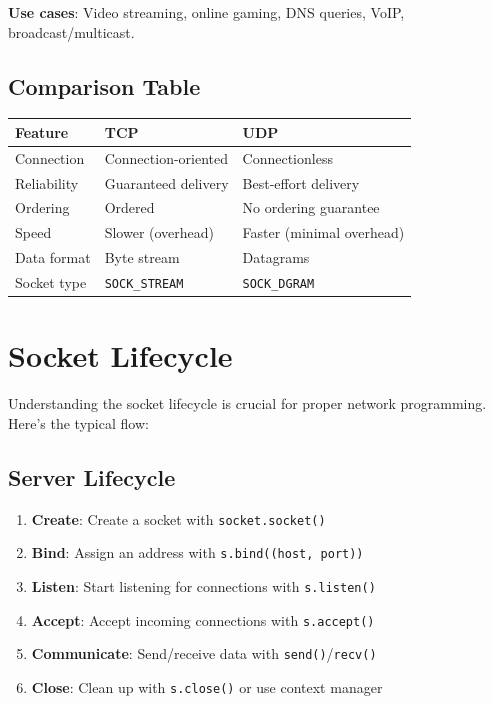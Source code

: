 \documentclass[]{article}
\begin{document}
  \textbf{Use cases}: Video streaming, online gaming, DNS queries, VoIP, broadcast/multicast.

  \subsection{Comparison Table}

  \begin{center}
  \begin{tabular}{lll}
    \toprule
    \textbf{Feature} & \textbf{TCP} & \textbf{UDP} \\
    \midrule
    Connection & Connection-oriented & Connectionless \\
    Reliability & Guaranteed delivery & Best-effort delivery \\
    Ordering & Ordered & No ordering guarantee \\
    Speed & Slower (overhead) & Faster (minimal overhead) \\
    Data format & Byte stream & Datagrams \\
    Socket type & \texttt{SOCK\_STREAM} & \texttt{SOCK\_DGRAM} \\
    \bottomrule
  \end{tabular}
  \end{center}

  \section{Socket Lifecycle}
  Understanding the socket lifecycle is crucial for proper network programming. Here's the typical flow:

  \subsection{Server Lifecycle}
  \begin{enumerate}
    \item \textbf{Create}: Create a socket with \texttt{socket.socket()}
    \item \textbf{Bind}: Assign an address with \texttt{s.bind((host, port))}
    \item \textbf{Listen}: Start listening for connections with \texttt{s.listen()}
    \item \textbf{Accept}: Accept incoming connections with \texttt{s.accept()}
    \item \textbf{Communicate}: Send/receive data with \texttt{send()}/\texttt{recv()}
    \item \textbf{Close}: Clean up with \texttt{s.close()} or use context manager
  \end{enumerate}
\end{document}
